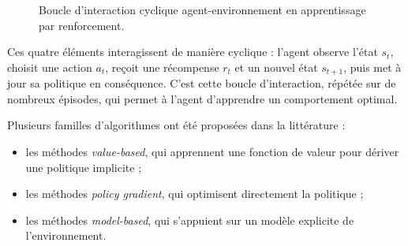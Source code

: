 \begin{figure}[H]
\centering
{}
\caption{Boucle d'interaction cyclique agent-environnement en apprentissage 
par renforcement.}
\label{fig:rl_cycle}
\end{figure}

Ces quatre éléments interagissent de manière cyclique : l'agent observe 
l'état $s_t$, choisit une action $a_t$, reçoit une récompense $r_t$ et 
un nouvel état $s_{t+1}$, puis met à jour sa politique en conséquence. 
C'est cette boucle d'interaction, répétée sur de nombreux épisodes, qui 
permet à l'agent d'apprendre un comportement optimal.

\vspace{0.3cm}

Plusieurs familles d'algorithmes ont été proposées dans la littérature \cite{ref2}:
\begin{itemize}
    \item les méthodes \textit{value-based}, qui apprennent une fonction de 
    valeur pour dériver une politique implicite ;
    \item les méthodes \textit{policy gradient}, qui optimisent directement 
    la politique ;
    \item les méthodes \textit{model-based}, qui s'appuient sur un modèle 
    explicite de l'environnement.
\end{itemize}

